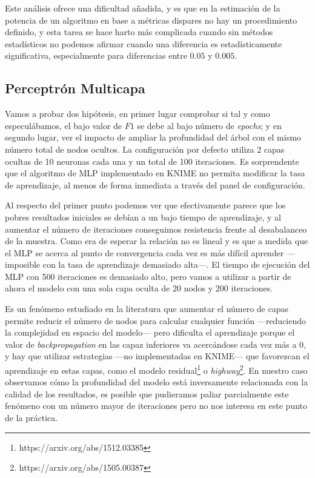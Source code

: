 \documentclass{article}
\newcommand{\img}[2]{
\noindent\makebox[\textwidth][c]{\texttt{[image: \#1]}}%
}
\begin{document}
Este análisis ofrece una dificultad añadida, y es que en la estimación de la potencia de un algoritmo en base a métricas dispares no hay un procedimiento definido, y esta tarea se hace harto más complicada cuando sin métodos estadísticos no podemos afirmar cuando una diferencia es estadísticamente significativa, especialmente para diferencias entre $0.05$ y $0.005$.

\subsection{Perceptrón Multicapa}

Vamos a probar dos hipótesis, en primer lugar comprobar si tal y como especulábamos, el bajo valor de $F1$ se debe al bajo número de \textit{epochs}; y en segundo lugar, ver el impacto de ampliar la profundidad del árbol con el mismo número total de nodos ocultos. La configuración por defecto utiliza 2 capas ocultas de 10 neuronas cada una y un total de 100 iteraciones. Es sorprendente que el algoritmo de MLP implementado en KNIME no permita modificar la tasa de aprendizaje, al menos de forma inmediata a través del panel de configuración.

\img{mlptuning}{1.2}

Al respecto del primer punto podemos ver que efectivamente parece que los pobres resultados iniciales se debían a un bajo tiempo de aprendizaje, y al aumentar el número de iteraciones conseguimos resistencia frente al desabalanceo de la muestra. Como era de esperar la relación no es lineal y es que a medida que el MLP se acerca al punto de convergencia cada vez es más difícil aprender ---imposible con la tasa de aprendizaje demasiado alta---. El tiempo de ejecución del MLP con 500 iteraciones es demasiado alto, pero vamos a utilizar a partir de ahora el modelo con una sola capa oculta de 20 nodos y 200 iteraciones.

\img{mlpfinaltuning}{1.2}

Es un fenómeno estudiado en la literatura que aumentar el número de capas permite reducir el número de nodos para calcular cualquier función ---reduciendo la complejidad en espacio del modelo--- pero dificulta el aprendizaje porque el valor de \textit{backpropagation} en las capaz inferiores va acercándose cada vez más a $0$, y hay que utilizar estrategias ---no implementadas en KNIME--- que favorezcan el aprendizaje en estas capas, como el modelo residual\footnote{https://arxiv.org/abs/1512.03385} o \textit{highway}\footnote{https://arxiv.org/abs/1505.00387}. En nuestro caso observamos cómo la profundidad del modelo está inversamente relacionada con la calidad de los resultados, es posible que pudieramos paliar parcialmente este fenómeno con un número mayor de iteraciones pero no nos interesa en este punto de la práctica.
\end{document}
